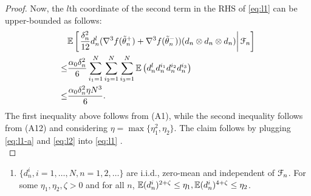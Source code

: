 \begin{proof}
Now, the $l$th coordinate of the second term in the RHS of \eqref{eq:l1} can be upper-bounded as follows:
\begin{align}
&\mathbb{E}\left[\left.\frac{\delta_n^2}{12} d_n^l (\nabla^3 f(\tilde  \theta_n^+)+\nabla^3 f(\tilde  \theta_n^-))(d_n \otimes d_n \otimes d_n)\right| \mathcal{F}_n\right]\nonumber\\
\le & \dfrac{\alpha_0 \delta_n^2}{6} \sum_{i_1=1}^N\sum_{i_2=1}^N\sum_{i_3=1}^N \mathbb{E}\left( d_n^l d_n^{i_1} d_n^{i_2} d_n^{i_3}\right)\nonumber\\
\le & \dfrac{\alpha_0 \delta_n^2\eta N^3}{6}.\label{eq:l2}
\end{align}
The first inequality above follows from (A1), while the second inequality follows from (A12) and considering $\eta = \max \{\eta_1^2, \eta_2\}$. The claim follows by plugging \eqref{eq:l1-a} and \eqref{eq:l2} into \eqref{eq:l1} .\\
\end{proof}

\begin{enumerate}[label=(\textbf{A\arabic*}),resume]
\item $\{d_n^i, i=1,\ldots,N, n=1,2,\ldots\}$ are i.i.d., zero-mean and independent of $\mathcal{F}_n$. For some $\eta_1,\eta_2,\zeta >0$ and for all $n$, $\mathbb{E}(d_n^i)^{2+\zeta} \le \eta_1,\mathbb{E}(d_n^i)^{4+\zeta} \le \eta_2$.
\end{enumerate}



